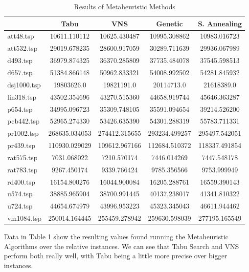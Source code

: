 \begin{table}[]
    \centering
    \begin{tabular}{lcccc}
    \cline{2-5}
                & \textbf{Tabu}   & \textbf{VNS}    & \textbf{Genetic} & \textbf{S. Annealing} \\ \hline
    att48.tsp   & 10611.110112    & 10625.430487    & 10995.308862     & 10983.016723       \\
    att532.tsp  & 29019.678235    & 28600.917059    & 30289.711639     & 29936.067989       \\
    d493.tsp    & 36979.874325    & 36370.285809    & 37735.484078     & 37545.598513       \\
    d657.tsp    & 51384.866148    & 50962.833321    & 54008.992502     & 54281.845932       \\
    dsj1000.tsp & 19803626.0 & 19821191.0 & 20114713.0  & 21618389.0  \\
    lin318.tsp  & 43502.354696    & 43270.515360    & 44658.919744     & 45646.363287       \\
    p654.tsp    & 34995.096723    & 35309.748105    & 35591.094654     & 39214.526200       \\
    pcb442.tsp  & 52965.274330    & 53426.635390    & 54301.288319     & 55783.711331       \\
    pr1002.tsp  & 268635.034053   & 274412.315655   & 293234.499257    & 295497.542051      \\
    pr439.tsp   & 110930.029029   & 109612.967166   & 112684.510372    & 118337.491854      \\
    rat575.tsp  & 7031.068022     & 7210.570174     & 7446.014269      & 7447.548178        \\
    rat783.tsp  & 9267.450174     & 9339.766424     & 9785.356566      & 9753.999949        \\
    rd400.tsp   & 16154.800276    & 16044.900084    & 16205.288761     & 16559.390143       \\
    u574.tsp    & 38885.965904    & 38700.991445    & 40137.238017     & 41341.810322       \\
    u724.tsp    & 44654.674979    & 43996.953223    & 45323.345043     & 46611.944462       \\
    vm1084.tsp  & 250014.164445   & 255459.278942   & 259630.598039    & 277195.165549      \\ \hline
    \end{tabular}
    \caption{Results of Metaheuristic Methods}
    \label{table:meta}
    \end{table}

    Data in Table \ref{table:meta} show the resulting values found running the Metaheuristic Algorithms over the relative instances. We can see that Tabu Search and VNS perform both really well, with Tabu being a little more precise over bigger instances. 








